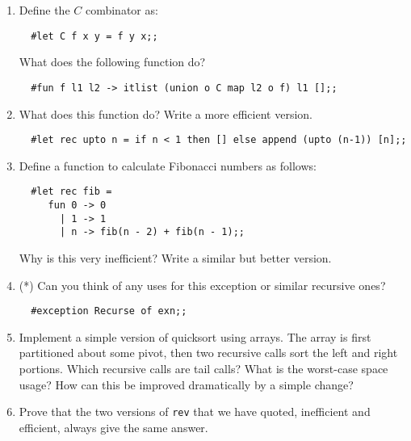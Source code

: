 \begin{enumerate}

\item Define the $C$ combinator as:

\begin{boxed}\begin{verbatim}
  #let C f x y = f y x;;
\end{verbatim}\end{boxed}

What does the following function do?

\begin{boxed}\begin{verbatim}
  #fun f l1 l2 -> itlist (union o C map l2 o f) l1 [];;
\end{verbatim}\end{boxed}

\item What does this function do? Write a more efficient version.

\begin{boxed}\begin{verbatim}
  #let rec upto n = if n < 1 then [] else append (upto (n-1)) [n];;
\end{verbatim}\end{boxed}

\item Define a function to calculate Fibonacci numbers as follows:

\begin{boxed}\begin{verbatim}
  #let rec fib =
     fun 0 -> 0
       | 1 -> 1
       | n -> fib(n - 2) + fib(n - 1);;
\end{verbatim}\end{boxed}

Why is this very inefficient? Write a similar but better version.

\item (*) Can you think of any uses for this exception or similar recursive
ones?

\begin{boxed}\begin{verbatim}
  #exception Recurse of exn;;
\end{verbatim}\end{boxed}

\item Implement a simple version of quicksort using arrays. The array is first
partitioned about some pivot, then two recursive calls sort the left and right
portions. Which recursive calls are tail calls? What is the worst-case space
usage? How can this be improved dramatically by a simple change?

\item Prove that the two versions of {\tt rev} that we have quoted, inefficient
and efficient, always give the same answer.

\end{enumerate}
